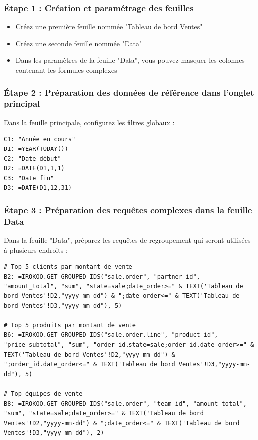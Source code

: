 \documentclass[12pt, a4paper]{article}
\begin{document}
\subsubsection{Étape 1 : Création et paramétrage des feuilles}

\begin{itemize}
    \item Créez une première feuille nommée "Tableau de bord Ventes"
    \item Créez une seconde feuille nommée "Data"
    \item Dans les paramètres de la feuille "Data", vous pouvez masquer les colonnes contenant les formules complexes
\end{itemize}

\subsubsection{Étape 2 : Préparation des données de référence dans l'onglet principal}

Dans la feuille principale, configurez les filtres globaux :

\begin{lstlisting}
C1: "Année en cours"
D1: =YEAR(TODAY())
C2: "Date début"
D2: =DATE(D1,1,1)
C3: "Date fin"
D3: =DATE(D1,12,31)
\end{lstlisting}

\subsubsection{Étape 3 : Préparation des requêtes complexes dans la feuille Data}

Dans la feuille "Data", préparez les requêtes de regroupement qui seront utilisées à plusieurs endroits :

\begin{lstlisting}
# Top 5 clients par montant de vente
B2: =IROKOO.GET_GROUPED_IDS("sale.order", "partner_id", "amount_total", "sum", "state=sale;date_order>=" & TEXT('Tableau de bord Ventes'!D2,"yyyy-mm-dd") & ";date_order<=" & TEXT('Tableau de bord Ventes'!D3,"yyyy-mm-dd"), 5)

# Top 5 produits par montant de vente
B6: =IROKOO.GET_GROUPED_IDS("sale.order.line", "product_id", "price_subtotal", "sum", "order_id.state=sale;order_id.date_order>=" & TEXT('Tableau de bord Ventes'!D2,"yyyy-mm-dd") & ";order_id.date_order<=" & TEXT('Tableau de bord Ventes'!D3,"yyyy-mm-dd"), 5)

# Top équipes de vente
B8: =IROKOO.GET_GROUPED_IDS("sale.order", "team_id", "amount_total", "sum", "state=sale;date_order>=" & TEXT('Tableau de bord Ventes'!D2,"yyyy-mm-dd") & ";date_order<=" & TEXT('Tableau de bord Ventes'!D3,"yyyy-mm-dd"), 2)
\end{lstlisting}
\end{document}
